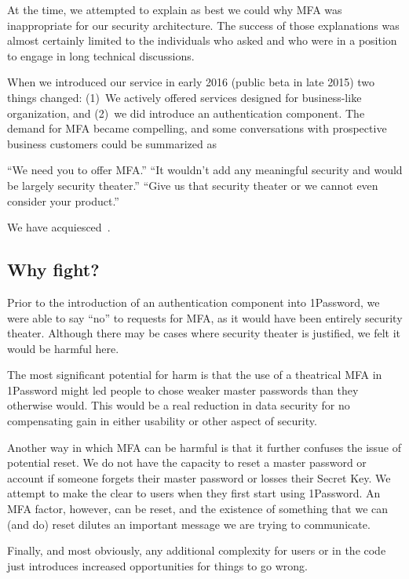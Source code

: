 \documentclass{soups}
\begin{document}
At the time, we attempted to explain as best we could why MFA was inappropriate for our security architecture. The success of those explanations was almost certainly limited to the individuals who asked and who were in a position to engage in long technical discussions.

When we introduced our service in early 2016 (public beta in late 2015) two things changed:
(1)~We actively offered services designed for business-like organization, and (2)~we did introduce an authentication component.
The demand for MFA became compelling,
and some conversations with prospective business customers could be summarized as 

“We need you to offer MFA\@.”\newline
“It wouldn't add any meaningful security and would be largely security theater.”\newline
“Give us that security theater or we cannot even consider your product.”

We have acquiesced~\autocite{Fillion18:mfa}.

\subsection{Why fight?}

Prior to the introduction of an authentication component into 1Password, we were able to say ``no'' to requests for MFA, as it would have been entirely security theater.
Although there may be cases where security theater is justified, we felt it would be harmful here.

The most significant potential for harm is that the use of a theatrical MFA in 1Password might led people to chose weaker master passwords than they otherwise would. This would be a real reduction in data security for no compensating gain in either usability or other aspect of security.

Another way in which MFA can be harmful is that it further confuses the issue of potential reset. We do not have the capacity to reset a master password or account if someone forgets their master password or losses their Secret Key. We attempt to make the clear to users when they first start using 1Password. An MFA factor, however, can be reset, and the existence of something that we can (and do) reset dilutes an important message we are trying to communicate.

Finally, and most obviously, any additional complexity for users or in the code just introduces increased opportunities for things to go wrong.
\end{document}
